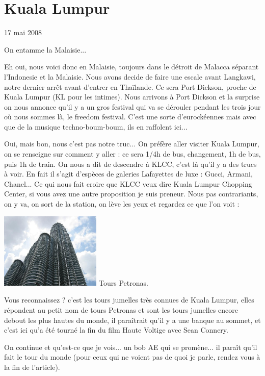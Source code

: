 \section{Kuala Lumpur}

17 mai 2008

\begin{multicols}{2}

On entamme la Malaisie...

Eh oui, nous voici donc en Malaisie, toujours dans le détroit de Malacca séparant l'Indonesie et la Malaisie. Nous avons decide de faire une escale avant Langkawi, notre dernier arrêt avant d'entrer en Thaïlande. Ce sera Port Dickson, proche de Kuala Lumpur (KL pour les intimes). Nous arrivons à Port Dickson et la surprise on nous annonce qu'il y a un gros festival qui va se dérouler pendant les trois jour où nous sommes là, le freedom festival. C'est une sorte d'eurockéennes mais avec que de la musique techno-boum-boum, ils en raffolent ici...

Oui, mais bon, nous c'est pas notre truc... On préfère aller visiter Kuala Lumpur, on se renseigne sur comment y aller : ce sera 1/4h de bus, changement, 1h de bus, puis 1h de train. On nous a dit de descendre à KLCC, c'est là qu'il y a des trucs à voir. En fait il s'agit d'espèces de galeries Lafayettes de luxe : Gucci, Armani, Chanel... Ce qui nous fait croire que KLCC veux dire Kuala Lumpur Chopping Center, si vous avez une autre proposition je suis preneur. Nous pas contrariants, on y va, on sort de la station, on lève les yeux et regardez ce que l'on voit :

\hspace*{-0.65cm}
\includegraphics[width=4.8cm]{articles/Kuala-lumpur/1210432312E0e6.jpg}
Tours Petronas.

Vous reconnaissez ? c'est les tours jumelles très connues de Kuala Lumpur, elles répondent au petit nom de tours Petronas et sont les tours jumelles encore debout les plus hautes du monde, il paraîtrait qu'il y a une banque au sommet, et c'est ici qu'a été tourné la fin du film Haute Voltige avec Sean Connery.

On continue et qu'est-ce que je vois... un bob AE qui se promène... il paraît qu'il fait le tour du monde (pour ceux qui ne voient pas de quoi je parle, rendez vous à la fin de l'article).


\end{multicols}
